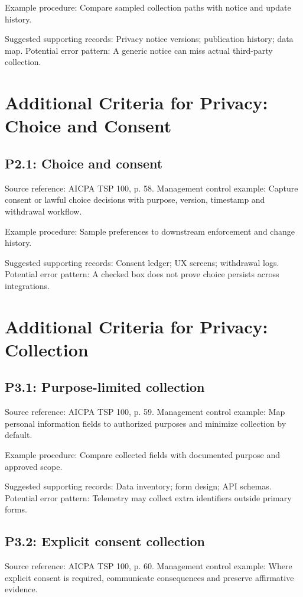 \documentclass[10pt,oneside]{report}
\begin{document}
Example procedure: Compare sampled collection paths with notice and update history.

Suggested supporting records: Privacy notice versions; publication history; data map. Potential error pattern: A generic notice can miss actual third-party collection.

\section{Additional Criteria for Privacy: Choice and Consent}
\subsection*{P2.1: Choice and consent}
Source reference: AICPA TSP 100, p. 58. Management control example: Capture consent or lawful choice decisions with purpose, version, timestamp and withdrawal workflow.

Example procedure: Sample preferences to downstream enforcement and change history.

Suggested supporting records: Consent ledger; UX screens; withdrawal logs. Potential error pattern: A checked box does not prove choice persists across integrations.

\section{Additional Criteria for Privacy: Collection}
\subsection*{P3.1: Purpose-limited collection}
Source reference: AICPA TSP 100, p. 59. Management control example: Map personal information fields to authorized purposes and minimize collection by default.

Example procedure: Compare collected fields with documented purpose and approved scope.

Suggested supporting records: Data inventory; form design; API schemas. Potential error pattern: Telemetry may collect extra identifiers outside primary forms.

\subsection*{P3.2: Explicit consent collection}
Source reference: AICPA TSP 100, p. 60. Management control example: Where explicit consent is required, communicate consequences and preserve affirmative evidence.
\end{document}
